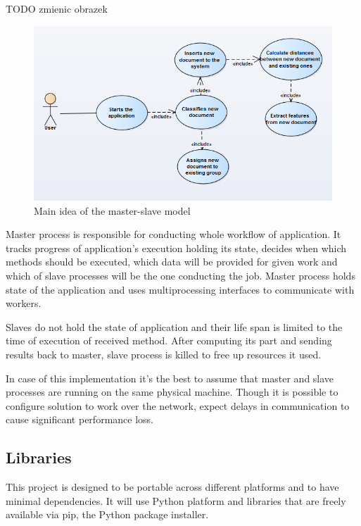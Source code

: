 TODO zmienic obrazek
\begin{figure}[H]
	\begin{center}
		\includegraphics[width=1.0\linewidth]{images/diagrams/use-case/use-case-11.PNG}
		\caption{Main idea of the master-slave model}
		\label{design-architecture}
	\end{center}
\end{figure}

Master process is responsible for conducting whole workflow of application. It tracks progress of application's execution holding its state, decides when which methods should be executed, which data will be provided for given work and which of slave processes will be the one conducting the job. Master process holds state of the application and uses multiprocessing interfaces to communicate with workers.

Slaves do not hold the state of application and their life span is limited to the time of execution of received method. After computing its part and sending results back to master, slave process is killed to free up resources it used.

In case of this implementation it's the best to assume that master and slave processes are running on the same physical machine. Though it is possible to configure solution to work over the network, expect delays in communication to cause significant performance loss.
 
\subsection{Libraries} \label{design-libraries}
This project is designed to be portable across different platforms and to have minimal dependencies. It will use Python platform and libraries that are freely available via pip, the Python package installer.

